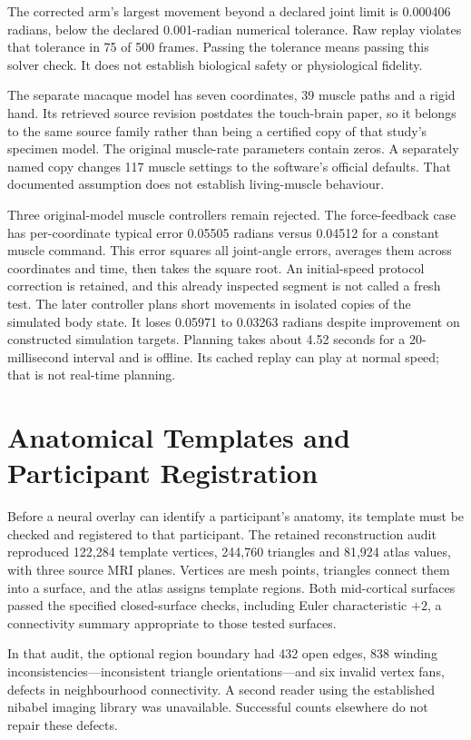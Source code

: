 The corrected arm's largest movement beyond a declared joint limit is 0.000406 radians,
below the declared 0.001-radian numerical tolerance. Raw replay violates that
tolerance in 75 of 500 frames. Passing the tolerance means passing this solver
check. It does not establish biological safety or physiological fidelity.

The separate macaque model has seven coordinates, 39 muscle paths and a rigid hand. Its retrieved source revision postdates the touch-brain paper, so it belongs to the same source family rather than being a certified copy of that study's specimen model. The original muscle-rate parameters contain zeros. A separately named copy changes 117 muscle settings to the software's official defaults. That documented assumption does not establish living-muscle behaviour.\citep{opensim2018,limblabmodel2026}

Three original-model muscle controllers remain rejected. The force-feedback
case has per-coordinate typical error 0.05505 radians versus 0.04512 for a
constant muscle command. This error squares all joint-angle errors, averages
them across coordinates and time, then takes the square root.
An initial-speed protocol correction is retained, and this already inspected
segment is not called a fresh test. The later controller plans short movements
in isolated copies of the simulated body state. It loses 0.05971 to 0.03263
radians despite improvement on constructed simulation targets. Planning
takes about 4.52 seconds for a 20-millisecond interval and is offline.
Its cached replay can play at normal speed; that is not real-time planning.

\section{Anatomical Templates and Participant Registration}

Before a neural overlay can identify a participant's anatomy, its template must be checked and registered to that participant. The retained reconstruction audit reproduced 122,284 template vertices, 244,760 triangles and 81,924 atlas values, with three source MRI planes. Vertices are mesh points, triangles connect them into a surface, and the atlas assigns template regions. Both mid-cortical surfaces passed the specified closed-surface checks, including Euler characteristic $+2$, a connectivity summary appropriate to those tested surfaces.

In that audit, the optional region boundary had 432 open edges, 838 winding inconsistencies---inconsistent triangle orientations---and six invalid vertex fans, defects in neighbourhood connectivity. A second reader using the established nibabel imaging library was unavailable. Successful counts elsewhere do not repair these defects.

